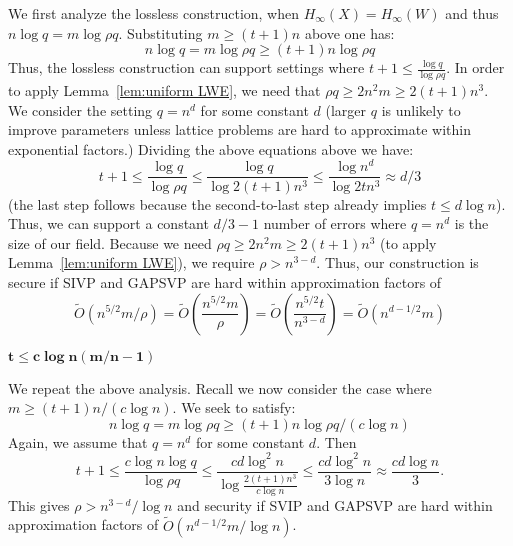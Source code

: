 \documentclass[11pt]{article}
\newcommand{\lemref}[1]{\mbox{Lemma~\ref{#1}}}
\begin{document}
{We first analyze the lossless construction, when  $H_\infty(X)=H_\infty(W)$ and thus $n\log q = m\log\rho q$.
Substituting $m \ge (t+1)n$ above one has:
\[
n \log q  = m \log \rho q \geq (t+1)n \log \rho q
\]
Thus, the lossless construction can support settings where $t+1\leq \frac{\log q}{\log \rho q}$.  In order to apply \lemref{lem:uniform LWE}, we need that $\rho q\geq 2n^2m \geq 2(t+1)n^3$.  We consider the setting $q = n^d$ for some constant $d$ (larger $q$ is unlikely to improve parameters unless 
lattice problems are hard to approximate within exponential factors.)  
Dividing the above equations above we have:
\[
t+1\leq \frac{\log q}{\log \rho q}\leq \frac{\log q}{\log 2(t+1) n^3}\leq \frac{\log n^d}{\log 2t n^3} \approx d/3
\]
(the last step follows because the second-to-last step already implies $t\le d\log n$).
Thus, we can support a constant $d/3-1$ number of errors where $q = n^d$ is the size of our field.  Because we need $\rho q\geq 2n^2m \geq 2(t+1)n^3$ (to apply \lemref{lem:uniform LWE}), we require $\rho > n^{3-d}$.  Thus, our construction is secure if SIVP and GAPSVP are hard within approximation factors of 
\[
\tilde{O}(n^{5/2}m/\rho) = \tilde{O}\left(\frac{n^{5/2} m }{\rho}\right)
= \tilde{O}\left(\frac{n^{5/2}t}{n^{3-d}}\right)
= \tilde{O}\left(n^{d-1/2}m\right)
\]


$\mathbf{t\leq c\log n(m/n -1)}$

We repeat the above analysis.  Recall we now consider the case where $m\geq (t+1)n/(c\log n)$.  We seek to satisfy:
\[
n\log q = m\log \rho q \geq (t+1)n \log \rho q /(c\log n)
\]
Again, we assume that $q = n^d$ for some constant $d$.  Then 
\[
t+1\leq \frac{c \log n \log q }{\log \rho q}\leq \frac{cd\log^2 n}{ \log \frac{2(t+1) n^3}{c\log n}}\leq \frac{cd \log^2 n}{3 \log n} \approx \frac{cd \log n}{3}.
\]
This gives $\rho > n^{3-d}/\log n$ and security if SVIP and GAPSVP are hard within approximation factors of $\tilde{O}(n^{d-1/2}m/\log n)$.

}
\end{document}
